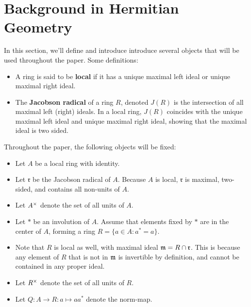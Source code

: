 \section{Background in Hermitian Geometry}

In this section, we'll define and introduce introduce several objects that will be used throughout the paper.
Some definitions:

\begin{itemize}
\item A ring is said to be \textbf{local} if it has a unique maximal left ideal or unique maximal right ideal.
\item The \textbf{Jacobson radical} of a ring $R$, denoted $J(R)$ is the intersection of all maximal left (right) ideals.
In a local ring, $J(R)$ coincides with the unique maximal left ideal and unique maximal right ideal, showing that the maximal ideal is two sided.
\end{itemize}
Throughout the paper, the following objects will be fixed:
\begin{itemize}
\item Let $A$ be a local ring with identity.

\item Let $\mathfrak{r}$ be the Jacobson radical of $A$. Because $A$ is local, $\mathfrak{r}$ is maximal, two-sided, and contains all non-units of $A$.

\item Let $A^\times$ denote the set of all units of $A$.

\item Let $*$ be an involution of $A$. Assume that elements fixed by $*$ are in the center of $A$, forming a ring $R = \{a \in A: a^* = a\}$. 

\item Note that $R$ is local as well, with maximal ideal $\mathfrak{m} = R \cap \mathfrak{r}$. 
This is because any element of $R$ that is not in $\mathfrak{m}$ is invertible by definition, and cannot be contained in any proper ideal.

\item Let $R^\times$ denote the set of all units of $R$.

\item Let $Q: A \to R: a \mapsto aa^*$ denote the norm-map.
\end{itemize}

